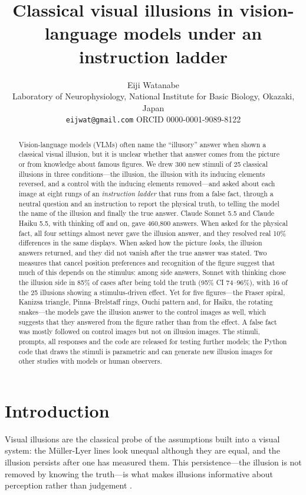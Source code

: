\documentclass[11pt]{article}
\title{Classical visual illusions in vision-language models under an instruction ladder}
\author{Eiji Watanabe\\
\small Laboratory of Neurophysiology, National Institute for Basic Biology, Okazaki, Japan\\
\small \texttt{eijwat@gmail.com} \quad ORCID 0000-0001-9089-8122}
\date{}
\begin{document}
\maketitle

\begin{abstract}
Vision-language models (VLMs) often name the ``illusory'' answer when shown a classical visual illusion, but it is
unclear whether that answer comes from the picture or from knowledge about famous figures. We drew 300 new stimuli
of 25 classical illusions in three conditions---the illusion, the illusion with its inducing elements reversed, and a
control with the inducing elements removed---and asked about each image at eight rungs of an \emph{instruction ladder}
that runs from a false fact, through a neutral question and an instruction to report the physical truth, to telling
the model the name of the illusion and finally the true answer. Claude Sonnet 5.5 and Claude Haiku 5.5, with
thinking off and on, gave 460,800 answers. When asked for the physical fact, all four settings almost never gave the
illusion answer, and they resolved real 10\% differences in the same displays. When asked how the picture
\emph{looks}, the illusion answers returned, and they did not vanish after the true answer was stated. Two measures that cancel position preferences and recognition of the figure suggest that much of this depends on the stimulus: among side answers, Sonnet with thinking chose the illusion side in 85\% of cases after being told the
truth (95\% CI 74--96\%), with 16 of the 25 illusions showing a stimulus-driven effect. Yet for five figures---the
Fraser spiral, Kanizsa triangle, Pinna--Brelstaff rings, Ouchi pattern and, for Haiku, the rotating snakes---the
models gave the illusion answer to the control images as well, which suggests that they answered from the figure rather than from the effect. A false fact was mostly followed on control images but not on illusion images. The stimuli, prompts, all
responses and the code are released for testing further models; the Python code that draws the stimuli is
parametric and can generate new illusion images for other studies with models or human observers.
\end{abstract}

\section{Introduction}

Visual illusions are the classical probe of the assumptions built into a visual system: the Müller-Lyer lines look
unequal although they are equal, and the illusion persists after one has measured them. This persistence---the
illusion is not removed by knowing the truth---is what makes illusions informative about perception rather than
judgement \citep{pylyshyn1999,firestone2016}.
\end{document}

